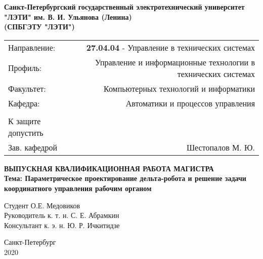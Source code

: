 \begin{center}
\hfill \break
\small{\textbf{Санкт-Петербургский государственный электротехнический университет}}\\
\small{\textbf{"ЛЭТИ" им. В. И. Ульянова (Ленина)}}\\
\small{\textbf{(СПБГЭТУ "ЛЭТИ")}}\\
\hfill \break

\begin{center}
\begin{tabular}{lr}
Направление: & \textbf{27.04.04} - Управление в технических системах \\
Профиль: &  Управление и информационные технологии в технических системах \\
Факультет: & Компьютерных технологий и информатики \\
Кафедра: & Автоматики и процессов управления \\
\\
К защите допустить & \\
Зав. кафедрой &  Шестопалов М. Ю.
\end{tabular}
\end{center}

\normalsize{}
\vspace{3cm}
\large{\textbf{ВЫПУСКНАЯ КВАЛИФИКАЦИОННАЯ РАБОТА МАГИСТРА}}\\
\vspace{1cm}
\normalsize{\textbf{Тема: Параметрическое проектирование дельта-робота и решение задачи координатного управления рабочим органом}}\\
\vspace{3cm}
 
\begin{flushleft}
 \hspace{1cm} Студент \hspace{7cm} \underline{\hspace{3cm}}  О.Е. Медовиков \\ 
 \vspace{5mm}
 \hspace{1cm} Руководитель \hspace{2cm} к. т. н. \hspace{2cm} \underline{\hspace{3cm}}  С. Е. Абрамкин\\ 
 \vspace{5mm}
 \hspace{1cm} Консультант \hspace{2.3cm} к. э. н. \hspace{2cm} \underline{\hspace{3cm}}  Ю. Р. Ичкитидзе\\ 
\end{flushleft}

\vspace{2cm}
Санкт-Петербург \\ 2020 
\end{center}
\thispagestyle{empty} %
 
